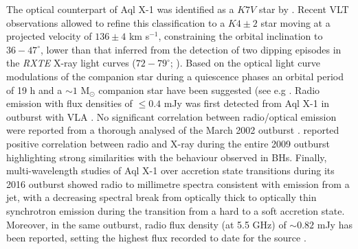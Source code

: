 \documentclass[graybox]{svmult}
\def \rxte {{\em RXTE\xspace}}
\begin{document}
The optical counterpart of Aql X-1 was identified as a $K7V$ star by \cite{Chevalier1999}. Recent VLT observations allowed to refine this classification to a $K4\pm2$ star moving at a projected velocity of $136\pm4$ km s$^{-1}$, constraining the orbital inclination to $36-47^\circ$, lower than that inferred from the detection of two dipping episodes in the \rxte{} X-ray light curves ($72-79^\circ$; \cite{Galloway2016}). Based on the optical light curve modulations of the companion star during a quiescence phases an orbital period of 19 h and a $\sim1$ M$_\odot$ companion star have been suggested (see e.g \cite{Thorstensen1978}. Radio emission with flux densities of $\leq0.4$ mJy was first detected from Aql X-1 in outburst with VLA \cite{Hjellming1990}. No significant correlation between radio/optical emission were reported from a thorough analysed of the March 2002 outburst \cite{Tudose2009,Maitra2008}. \cite{MillerJones2010} reported positive correlation between radio and X-ray during the entire 2009 outburst highlighting strong similarities with the behaviour observed in BHs. Finally, multi-wavelength studies of Aql X-1 over accretion state transitions during its 2016 outburst showed radio to millimetre spectra consistent with emission from a jet, with a decreasing spectral break from optically thick to optically thin synchrotron emission during the transition from a hard to a soft accretion state. Moreover, in the same outburst, radio flux density (at 5.5 GHz) of $\sim0.82$ mJy has been reported, setting the highest flux recorded to date for the source \cite{DiazTrigo2018}. 
\end{document}
